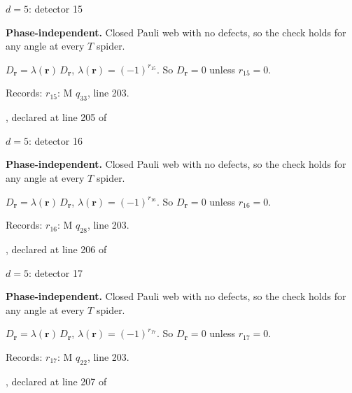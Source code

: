 \label{d5_det015}
{\Large $d=5$: detector 15}\par
\textbf{Phase-independent.} Closed Pauli web with no defects, so the check holds for any angle at every $T$ spider.
\begin{center}
\end{center}
\vspace{-1mm}
$D_{\boldsymbol r}=\lambda(\boldsymbol r)\,D_{\boldsymbol r}$, \quad $\lambda(\boldsymbol r)=(-1)^{r_{15}}$. \qquad So $D_{\boldsymbol r}=0$ unless $r_{15}=0$.
\par\smallskip\begin{minipage}{.98\linewidth}\small Records: $r_{15}$: M $q_{33}$, line 203.\end{minipage}
\vfill
{\footnotesize\texttt{}, declared at line 205 of \texttt{}}
\newpage

\label{d5_det016}
{\Large $d=5$: detector 16}\par
\textbf{Phase-independent.} Closed Pauli web with no defects, so the check holds for any angle at every $T$ spider.
\begin{center}
\end{center}
\vspace{-1mm}
$D_{\boldsymbol r}=\lambda(\boldsymbol r)\,D_{\boldsymbol r}$, \quad $\lambda(\boldsymbol r)=(-1)^{r_{16}}$. \qquad So $D_{\boldsymbol r}=0$ unless $r_{16}=0$.
\par\smallskip\begin{minipage}{.98\linewidth}\small Records: $r_{16}$: M $q_{28}$, line 203.\end{minipage}
\vfill
{\footnotesize\texttt{}, declared at line 206 of \texttt{}}
\newpage

\label{d5_det017}
{\Large $d=5$: detector 17}\par
\textbf{Phase-independent.} Closed Pauli web with no defects, so the check holds for any angle at every $T$ spider.
\begin{center}
\end{center}
\vspace{-1mm}
$D_{\boldsymbol r}=\lambda(\boldsymbol r)\,D_{\boldsymbol r}$, \quad $\lambda(\boldsymbol r)=(-1)^{r_{17}}$. \qquad So $D_{\boldsymbol r}=0$ unless $r_{17}=0$.
\par\smallskip\begin{minipage}{.98\linewidth}\small Records: $r_{17}$: M $q_{22}$, line 203.\end{minipage}
\vfill
{\footnotesize\texttt{}, declared at line 207 of \texttt{}}
\newpage

